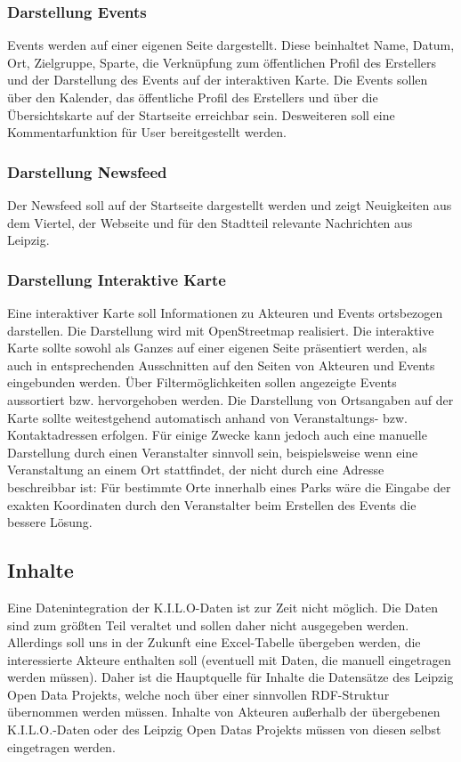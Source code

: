 \documentclass{swp}
\begin{document}
\subsubsection{Darstellung Events}
Events werden auf einer eigenen Seite dargestellt. Diese beinhaltet Name, Datum, Ort, Zielgruppe, Sparte, die Verkn\"upfung zum \"offentlichen Profil des Erstellers und der Darstellung des Events auf der interaktiven Karte. Die Events sollen \"uber den Kalender, das \"offentliche Profil des Erstellers und \"uber die \"Ubersichtskarte auf der Startseite erreichbar sein. Desweiteren soll eine Kommentarfunktion f\"ur User bereitgestellt werden. 
\subsubsection{Darstellung Newsfeed}
Der Newsfeed soll auf der Startseite dargestellt werden und zeigt Neuigkeiten \glqq aus dem Viertel\grqq{}, der Webseite und f\"ur den Stadtteil relevante Nachrichten aus Leipzig.
\subsubsection{Darstellung Interaktive Karte}
Eine interaktiver Karte soll Informationen zu Akteuren und Events ortsbezogen darstellen. Die Darstellung wird mit OpenStreetmap realisiert. Die interaktive Karte sollte sowohl als Ganzes auf einer eigenen Seite pr\"asentiert werden, als auch in entsprechenden Ausschnitten auf den Seiten von Akteuren und Events eingebunden werden. \"Uber Filterm\"oglichkeiten sollen angezeigte Events aussortiert bzw. hervorgehoben werden. Die Darstellung von Ortsangaben auf der Karte sollte weitestgehend automatisch anhand von Veranstaltungs- bzw. Kontaktadressen erfolgen. F\"ur einige Zwecke kann jedoch auch eine manuelle Darstellung durch einen Veranstalter sinnvoll sein, beispielsweise wenn eine Veranstaltung an einem Ort stattfindet, der nicht durch eine Adresse beschreibbar ist: F\"ur bestimmte Orte innerhalb eines Parks w\"are die Eingabe der exakten Koordinaten durch den Veranstalter beim Erstellen des Events die bessere L\"osung. 
\subsection{Inhalte}
Eine Datenintegration der K.I.L.O-Daten ist zur Zeit nicht m\"oglich. Die Daten sind zum gr\"o{\ss}ten Teil veraltet und sollen daher nicht ausgegeben werden. Allerdings soll uns in der Zukunft eine Excel-Tabelle \"ubergeben werden, die interessierte Akteure enthalten soll (eventuell mit Daten, die manuell eingetragen werden m\"ussen). Daher ist die Hauptquelle f\"ur Inhalte die Datens\"atze des Leipzig Open Data Projekts, welche noch \"uber einer sinnvollen RDF-Struktur \"ubernommen werden m\"ussen. Inhalte von Akteuren au{\ss}erhalb der \"ubergebenen K.I.L.O.-Daten oder des Leipzig Open Datas Projekts m\"ussen von diesen selbst eingetragen werden. 
\end{document}

